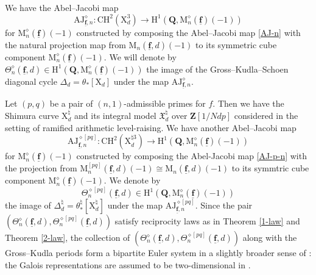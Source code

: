 \documentclass[10pt]{amsart}
\newcommand*\Z{\mathds{Z}}
\newcommand*\ZZ{|[draw,circle]| \Z_2}
\numberwithin{equation}{section}
\theoremstyle{plain}
\numberwithin{equation}{section}
\theoremstyle{definition}
\theoremstyle{remark}
\def\interX{\mathfrak{X}}
\def\triplef{\underline{\mathbf{f}}}
\def\QQ{\mathbf{Q}}
\def\ZZ{\mathbf{Z}}
\def\rmH{\mathrm{H}}
\def\rmM{\mathrm{M}}
\def\rmX{\mathrm{X}}
\begin{document}
We have the Abel--Jacobi map 
\begin{equation*}
\mathrm{AJ}^{\diamond}_{\triplef, n}: \mathrm{CH}^{2}(\rmX^{3}_{d})\rightarrow \rmH^{1}(\QQ, \rmM^{\diamond}_{n}(\triplef)(-1))
\end{equation*}
for $\rmM^{\diamond}_{n}(\triplef)(-1)$ constructed by composing the Abel--Jacobi map \eqref{AJ-n} with the natural projection map from $\rmM_{n}(\triplef, d)(-1)$ to its symmetric cube component $\rmM^{\diamond}_{n}(\triplef)(-1)$. We will denote by $\Theta^{\diamond}_{n}(\triplef, d) \in \rmH^{1}(\QQ, \rmM^{\diamond}_{n}(\triplef)(-1))$ the image of the Gross--Kudla--Schoen diagonal cycle $\Delta_{d}=\theta_{*}[\rmX_{d}]$ under the map $\mathrm{AJ}^{\diamond}_{\triplef, n}$.

Let $(p, q)$ be a pair of $(n, 1)$-admissible primes for $f$. Then we have the Shimura curve $\rmX^{\natural}_{d}$ and its integral model $\interX^{\natural}_{d}$ over $\ZZ[1/Ndp]$ considered in the setting of ramified arithmetic level-raising. We have another Abel--Jacobi map
\begin{equation*}
\mathrm{AJ}^{\diamond[pq]}_{\triplef, n}: \mathrm{CH}^{2}(\rmX^{\natural3}_{d})\rightarrow \rmH^{1}(\QQ,  \rmM^{\diamond}_{n}(\triplef)(-1))
\end{equation*}
for $\rmM^{\diamond}_{n}(\triplef)(-1)$ constructed by composing the Abel-Jacobi map \eqref{AJ-p-n} with the projection from $\rmM^{[pq]}_{n}(\triplef, d)(-1)\cong\rmM_{n}(\triplef, d)(-1)$ to its symmtric cube component $\rmM^{\diamond}_{n}(\triplef)(-1)$. We denote by 
\begin{equation*}
\Theta^{\diamond[pq]}_{n}(\triplef, d) \in \rmH^{1}(\QQ,  \rmM^{\diamond}_{n}(\triplef)(-1))
\end{equation*}
the image of $\Delta^{\natural}_{d}=\theta^{\natural}_{*}[\rmX^{\natural}_{d}]$ under 
the map $\mathrm{AJ}^{\diamond[pq]}_{\triplef, n}$. 
Since the pair $(\Theta^{\diamond}_{n}(\triplef, d), \Theta^{\diamond[pq]}_{n}(\triplef,d))$
satisfy  reciprocity laws as in  Theorem \ref{1-law} and Theorem \ref{2-law}, the collection of $(\Theta^{\diamond}_{n}(\triplef,d), \Theta^{\diamond[pq]}_{n}(\triplef,d))$ along with the Gross--Kudla periods form a bipartite Euler system in a slightly broader sense of \cite{How}: the Galois representations are assumed to be two-dimensional in \cite{How}. 
\end{document}

